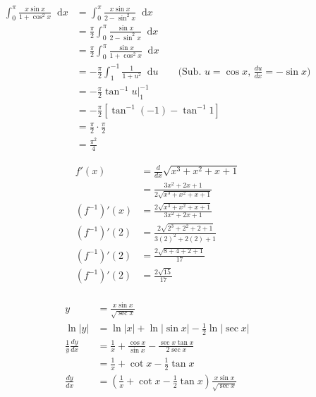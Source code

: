 \documentclass[12pt]{article}
\newcommand*\diff{\mathop{}\!\mathrm{d}}
\newenvironment{problem}[2][Problem]{\begin{trivlist}
\item[\hskip \labelsep {\bfseries #1}\hskip \labelsep {\bfseries #2.}]}{\end{trivlist}}
\begin{document}
\begin{problem}{5.ii}
\end{problem}
\begin{align*}
\int_{0}^{\pi} \frac{x\sin x}{1 + \cos^2x} \diff x &= \int_{0}^{\pi} \frac{x\sin x}{2 - \sin^2x} \diff x \\
&= \frac{\pi}{2} \int_{0}^{\pi} \frac{\sin x}{2 - \sin^2x} \diff x\\
&= \frac{\pi}{2} \int_{0}^{\pi} \frac{\sin x}{1 + \cos^2x} \diff x\\
&= -\frac{\pi}{2} \int_{1}^{-1} \frac{1}{1 + u^2} \diff u \qquad \text{(Sub. $u = \cos x$, $\frac{du}{dx} = -\sin x$)}\\
&= -\frac{\pi}{2} \tan^{-1}u \biggl|_{1}^{-1} \\
&= -\frac{\pi}{2} [\tan^{-1} (-1) - \tan^{-1} 1]\\
&= \frac{\pi}{2} \cdot \frac{\pi}{2}\\
&= \frac{\pi^2}{4}
\end{align*}

\begin{problem}{6.b}
\end{problem}
\begin{align*}
f'(x) &= \frac{d}{dx} \sqrt{x^3 + x^2 + x + 1} \\
&= \frac{3x^2 + 2x + 1}{2\sqrt{x^3 + x^2 + x + 1}} \\
(f^{-1})'(x) &= \frac{2\sqrt{x^3 + x^2 + x + 1}}{3x^2 + 2x + 1} \\
(f^{-1})'(2) &= \frac{2\sqrt{2^3 + 2^2 + 2 + 1}}{3(2)^2 + 2(2) + 1} \\
(f^{-1})'(2) &= \frac{2\sqrt{8 + 4 + 2 + 1}}{17} \\
(f^{-1})'(2) &= \frac{2\sqrt{15}}{17} \\
\end{align*}

\begin{problem}{7.b}
\end{problem}
\begin{align*}
y &= \frac{x\sin x}{\sqrt{\sec x}}\\
\ln |y| &= \ln |x| + \ln|\sin x| - \frac{1}{2} \ln|{\sec x}|\\
\frac{1}{y} \frac{dy}{dx} &= \frac{1}{x} + \frac{\cos x}{\sin x} - \frac{\sec x \tan x}{2\sec x}\\
&= \frac{1}{x} + \cot x - \frac{1}{2}\tan x\\
\frac{dy}{dx} &= (\frac{1}{x} + \cot x - \frac{1}{2}\tan x)\frac{x\sin x}{\sqrt{\sec x}}
\end{align*}
\end{document}
